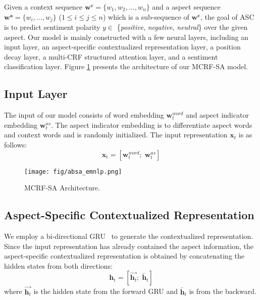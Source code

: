\documentclass[11pt,a4paper]{article}
\begin{document}
Given a context sequence $\mathbf{w^c} = \{w_1,w_2,\dots, w_n \}$ and a aspect sequence $\mathbf{w^a} = \{w_i, ..., w_j\}$ ($1\leq i\leq j\leq n$) which is a sub-sequence of $\mathbf{w^c}$, the goal of ASC is to predict sentiment polarity $y \in$ \{{\em positive}, {\em negative}, {\em neutral}\} over the given aspect.
Our model is mainly constructed with a few neural layers, including an input layer, an aspect-specific contextualized representation layer, a position decay layer, a multi-CRF structured  attention layer, and a sentiment classification layer. Figure \ref{fig:architecture} presents the architecture of our MCRF-SA model.









\subsection{Input Layer}
The input of our model consists of word embedding $\mathbf{w}^{word}_t$ and aspect indicator embedding $\mathbf{w}^{as}_t$. The aspect indicator embedding is to differentiate aspect words and context words and is randomly initialized.  The input representation $\mathbf{x}_t$ is as follows:
\setlength{\abovedisplayskip}{-5pt} \setlength{\abovedisplayshortskip}{-5pt}
\begin{equation}
\mathrm{\mathbf{x}_t}= [ \mathbf{w}^{word}_t; \; \mathbf{w}^{as}_t]
\end{equation}








\begin{figure}[!t]
    \centering
    \texttt{[image: fig/absa\_emnlp.png]}
\caption{MCRF-SA Architecture.}
    \label{fig:architecture}
\vspace{-1mm}

\end{figure}

\subsection{{Aspect-Specific Contextualized Representation}}
We employ a bi-directional GRU~\cite{Cho2014OnTP} to generate the contextualized  representation.
Since the input representation has already contained the aspect information,  the aspect-specific contextualized representation is obtained by concatenating the hidden states from both directions:
\setlength{\abovedisplayskip}{7pt} \setlength{\abovedisplayshortskip}{7pt}
\setlength{\belowdisplayskip}{7pt} \setlength{\belowdisplayshortskip}{7pt}
\begin{equation}
    \mathrm{\mathbf{h}_t} = [\overrightarrow{\mathbf{h}_t} ; \; \overleftarrow{\mathbf{h}_t}]
\end{equation}
where $\overrightarrow{\mathbf{h}_t}$ is the hidden state from the forward GRU and $\overleftarrow{\mathbf{h}_t}$ is from the backward.
\end{document}
